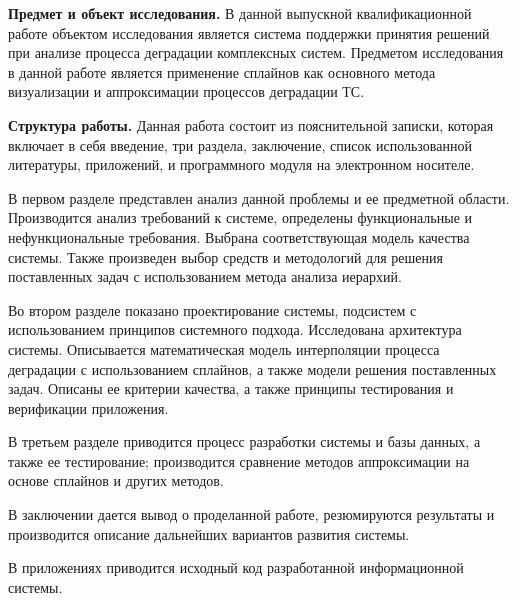 \textbf{Предмет и объект исследования.}
В данной выпускной квалификационной работе объектом исследования является система поддержки принятия решений при анализе процесса деградации комплексных систем.
Предметом исследования в данной работе является применение сплайнов как основного метода визуализации и аппроксимации процессов деградации ТС.

\textbf{Структура работы.}
Данная работа состоит из пояснительной записки, которая включает в себя введение, три раздела, заключение, список использованной литературы, приложений, и программного модуля на электронном носителе.

В первом разделе представлен анализ данной проблемы и ее предметной области. 
Производится анализ требований к системе, определены функциональные и нефункциональные требования. 
Выбрана соответствующая модель качества системы. 
Также произведен выбор средств и методологий для решения поставленных задач с использованием метода анализа иерархий.

Во втором разделе показано проектирование системы, подсистем с использованием принципов системного подхода. 
Исследована архитектура системы. 
Описывается математическая модель интерполяции процесса деградации с использованием сплайнов, а также модели решения поставленных задач. 
Описаны ее критерии качества, а также принципы тестирования и верификации приложения.

В третьем разделе приводится процесс разработки системы и базы данных, а также ее тестирование; производится сравнение методов аппроксимации на основе сплайнов и других методов.

В заключении дается вывод о проделанной работе, резюмируются результаты и производится описание дальнейших вариантов развития системы.

В приложениях приводится исходный код разработанной информационной системы.





